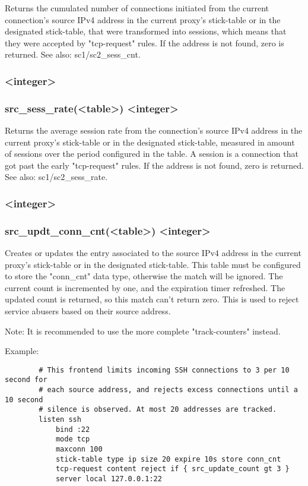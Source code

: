 Returns the cumulated number of connections initiated from the current
connection's source IPv4 address in the current proxy's stick-table or in the
designated stick-table, that were transformed into sessions, which means that
they were accepted by "tcp-request" rules. If the address is not found, zero
is returned.
See also: sc1/sc2\_sess\_cnt.

\subsubsection[src\_sess\_rate]{ <integer>}
\subsubsection*{src\_sess\_rate(<table>) <integer>}

Returns the average session rate from the connection's source IPv4 address in
the current proxy's stick-table or in the designated stick-table, measured in
amount of sessions over the period configured in the table. A session is a
connection that got past the early "tcp-request" rules. If the address is not
found, zero is returned.
See also: sc1/sc2\_sess\_rate.

\subsubsection[src\_updt\_conn\_cnt]{ <integer>}
\subsubsection*{src\_updt\_conn\_cnt(<table>) <integer>}

Creates or updates the entry associated to the source IPv4 address in the
current proxy's stick-table or in the designated stick-table. This table
must be configured to store the "conn\_cnt" data type, otherwise the match
will be ignored. The current count is incremented by one, and the expiration
timer refreshed. The updated count is returned, so this match can't return
zero. This is used to reject service abusers based on their source address.

\begin{note}{Note:}
It is recommended to use the more complete "track-counters" instead.
\end{note}

  Example:
  \begin{verbatim}
        # This frontend limits incoming SSH connections to 3 per 10 second for
        # each source address, and rejects excess connections until a 10 second
        # silence is observed. At most 20 addresses are tracked.
        listen ssh
            bind :22
            mode tcp
            maxconn 100
            stick-table type ip size 20 expire 10s store conn_cnt
            tcp-request content reject if { src_update_count gt 3 }
            server local 127.0.0.1:22
  \end{verbatim}

